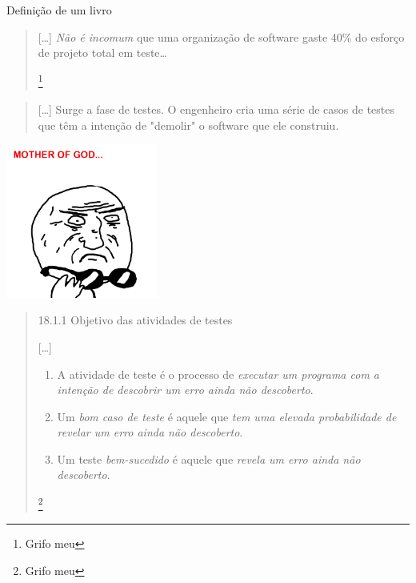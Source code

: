 \begin{frame}
  \begin{center}
    \Huge Definição de um livro
  \end{center}
\end{frame}

\begin{frame}{\subsecname}
  \blockquote[{\cite[Pressman]{pressman_engenharia_1995}}]{
    [\ldots] \emph{Não é incomum} que uma organização de software gaste 40\%
    do esforço de projeto total em teste\ldots

    \let\thefootnote\relax\footnote{Grifo meu}
  }
\end{frame}

\begin{frame}{\subsecname}
  \blockquote[{\cite[Pressman]{pressman_engenharia_1995}}]{
    [\ldots] Surge a fase de testes. O engenheiro cria uma série de casos de testes
    que têm a intenção de "demolir" o software que ele construiu.
  }
\end{frame}

\begin{frame}{\subsecname}
  \begin{center}
    \includegraphics[width=5cm]{images/mother-of-god}
  \end{center}
\end{frame}

\begin{frame}{\subsecname}
  \blockquote[{\cite[Pressman]{pressman_engenharia_1995}}]{
    18.1.1 Objetivo das atividades de testes

    [\ldots]
    \begin{enumerate}
      \item A atividade de teste é o processo de \emph{executar um programa com
          a intenção de descobrir um erro ainda não descoberto}.
      \item Um \emph{bom caso de teste} é aquele que \emph{tem uma elevada
        probabilidade de revelar um erro ainda não descoberto}.
      \item Um teste \emph{bem-sucedido} é aquele que \emph{revela um erro
          ainda não descoberto}.
    \end{enumerate}

    \let\thefootnote\relax\footnote{Grifo meu}
  }
\end{frame}

